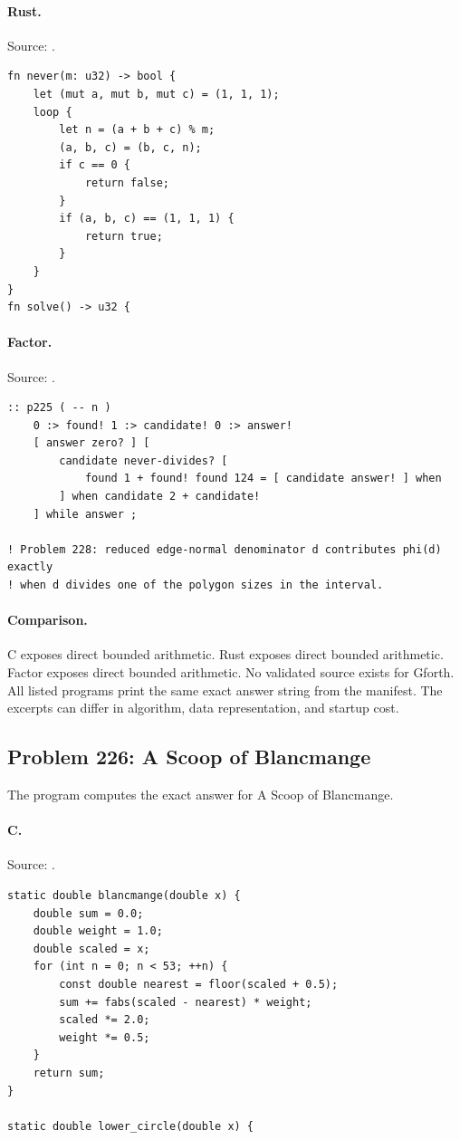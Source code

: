 \paragraph{Rust.} Source: .
\begin{lstlisting}
fn never(m: u32) -> bool {
    let (mut a, mut b, mut c) = (1, 1, 1);
    loop {
        let n = (a + b + c) % m;
        (a, b, c) = (b, c, n);
        if c == 0 {
            return false;
        }
        if (a, b, c) == (1, 1, 1) {
            return true;
        }
    }
}
fn solve() -> u32 {
\end{lstlisting}

\paragraph{Factor.} Source: .
\begin{lstlisting}
:: p225 ( -- n )
    0 :> found! 1 :> candidate! 0 :> answer!
    [ answer zero? ] [
        candidate never-divides? [
            found 1 + found! found 124 = [ candidate answer! ] when
        ] when candidate 2 + candidate!
    ] while answer ;

! Problem 228: reduced edge-normal denominator d contributes phi(d) exactly
! when d divides one of the polygon sizes in the interval.
\end{lstlisting}

\paragraph{Comparison.}
C exposes direct bounded arithmetic. Rust exposes direct bounded arithmetic. Factor exposes direct bounded arithmetic.
No validated source exists for Gforth.
All listed programs print the same exact answer string from the manifest. The excerpts can differ in algorithm, data representation, and startup cost.

\subsection{Problem 226: A Scoop of Blancmange}
\label{walkthrough:p226}
The program computes the exact answer for A Scoop of Blancmange.

\paragraph{C.} Source: .
\begin{lstlisting}
static double blancmange(double x) {
    double sum = 0.0;
    double weight = 1.0;
    double scaled = x;
    for (int n = 0; n < 53; ++n) {
        const double nearest = floor(scaled + 0.5);
        sum += fabs(scaled - nearest) * weight;
        scaled *= 2.0;
        weight *= 0.5;
    }
    return sum;
}

static double lower_circle(double x) {
\end{lstlisting}

